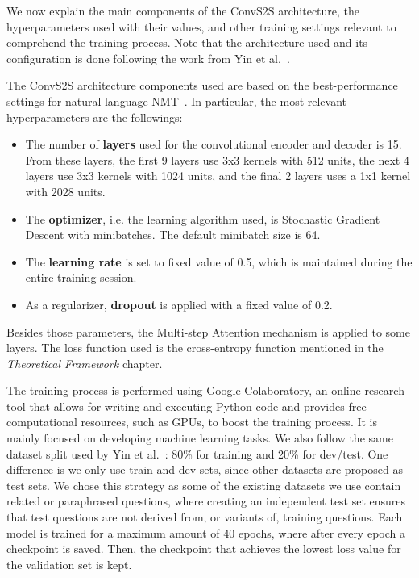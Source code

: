 We now explain the main components of the ConvS2S architecture, the hyperparameters used with 
their values, and other training settings relevant to comprehend the training process. Note 
that the architecture used and its configuration is done following the work from 
Yin et al.~\cite{nmt:nl-to-sparql-Yin19}.

The ConvS2S architecture components used are based on the best-performance settings for 
natural language NMT~\cite{nmt:nl-to-sparql-Yin19}. In particular, the most relevant 
hyperparameters are the followings:

\begin{itemize}
    \item The number of \textbf{layers} used for the convolutional encoder and decoder is 15. 
    From these layers, the first 9 layers use 3x3 kernels with 512 units, the next 4 layers 
    use 3x3 kernels with 1024 units, and the final 2 layers uses a 1x1 kernel with 2028 units.
    \item The \textbf{optimizer}, i.e. the learning algorithm used, is Stochastic Gradient 
    Descent with minibatches. The default minibatch size is 64.
    \item The \textbf{learning rate} is set to fixed value of 0.5, which is maintained during 
    the entire training session.
    \item As a regularizer, \textbf{dropout} is applied with a fixed value of 0.2.
\end{itemize}

Besides those parameters, the Multi-step Attention mechanism is applied to some layers. The 
loss function used is the cross-entropy function mentioned in the \textit{Theoretical 
Framework} chapter.

The training process is performed using Google Colaboratory, an online research tool that 
allows for writing and executing Python code and provides free computational resources, such 
as GPUs, to boost the training process. It is mainly focused on developing machine learning 
tasks. We also follow the same dataset split used by Yin et al.~\cite{nmt:nl-to-sparql-Yin19}: 
80\% for training and 20\% for dev/test. One difference is we only use train and dev sets, 
since other datasets are proposed as test sets. We chose this strategy as some of the 
existing datasets we use contain related or paraphrased questions, where creating an 
independent test set ensures that test questions are not derived from, or variants of, 
training questions. Each model is trained for a maximum amount of 40 epochs, where after 
every epoch a checkpoint is saved. Then, the checkpoint that achieves the lowest loss value 
for the validation set is kept.

